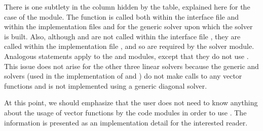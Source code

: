 There is one subtlety in the {\cvspils} column hidden by the table, explained
here for the case of the {\cvspgmr} module. 
The  function is called both within the interface file
 and within the implementation
files  and  for the generic
{\spgmr} solver upon which the {\cvspgmr} solver is built.  Also, although
 and  are not called within the interface file
, they are called within the implementation file
, and so are required by the {\cvspgmr} solver module.
Analogous statements apply to the {\cvspbcg} and {\cvsptfqmr} modules,
except that they do not use .
This issue does not arise for the other 
three {\cvodes} linear solvers because the generic {\dense} and {\band} solvers 
(used in the implementation of {\cvdense} and {\cvband}) do not make calls to 
any vector functions and {\cvdiag} is not implemented using a generic diagonal solver. 

At this point, we should emphasize that the {\cvodes} user does not need to know 
anything about the usage of vector functions by the {\cvodes} code modules in order 
to use {\cvodes}. The information is presented as an implementation detail for the 
interested reader.

